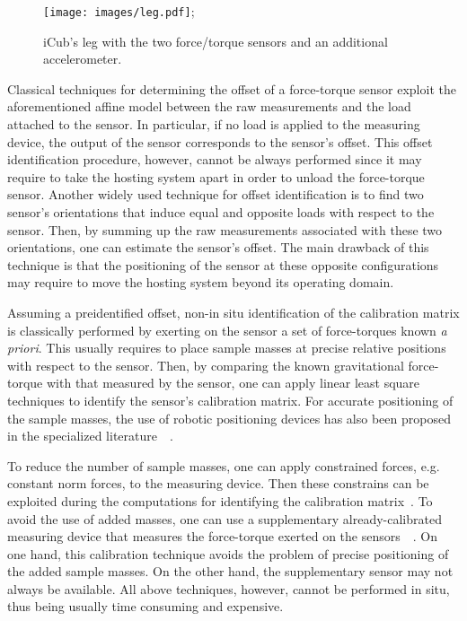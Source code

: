 \begin{figure}
\vspace{0em}
\centering
\texttt{[image: images/leg.pdf]};
\caption{iCub's leg with the two force/torque sensors and an additional accelerometer.}
\label{fig:iCubLeg}
\end{figure} 
Classical techniques for determining the offset of a force-torque sensor exploit the aforementioned affine model between 
the raw measurements and the load attached to the sensor. In particular, if no load is applied to the measuring device, the output of the sensor corresponds to 
the sensor's offset. This offset identification procedure, however, cannot be always performed since it may require to take the hosting system apart
in order to unload the force-torque sensor. Another widely used technique for offset identification is to find two sensor's orientations that induce
equal and opposite loads with respect to the sensor. Then, by summing up the raw measurements associated with these two orientations, one can estimate
the sensor's offset. The main drawback of this technique is that the positioning of the sensor at these opposite configurations may require to move
the hosting system beyond its operating domain.

Assuming a preidentified offset, non-in situ identification of the calibration matrix is classically performed by exerting on  
the sensor a set of force-torques known \emph{a priori}. This usually requires to place 
sample masses at precise relative positions with respect to the sensor. Then, by comparing
the known gravitational force-torque with that measured by the sensor, 
one can apply linear least square techniques to identify the sensor's calibration matrix.
For accurate positioning of the sample masses, the use of robotic positioning devices 
has also been proposed in the specialized 
literature~\cite{uchiyama1991systematic}~\cite{watson1975pedestal}.

To reduce the number of sample masses,
one can apply constrained forces, e.g. constant norm forces, to the measuring device.
Then these constrains can be exploited during the computations for identifying the calibration matrix~\cite{voyles1997shape}.
To avoid the use of added masses, one can use a supplementary already-calibrated measuring device that measures 
the force-torque exerted on the sensors~\cite{faber2012force}~\cite{oddo2007}.
On one hand, this calibration technique avoids the problem of precise positioning of the added sample masses.
On the other hand, 
the supplementary sensor may not always be available.
All above techniques, however, cannot be performed in situ, thus  being usually time consuming and expensive.


